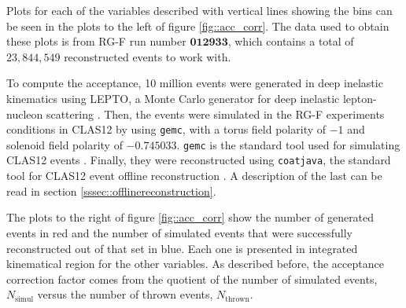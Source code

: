     Plots for each of the variables described with vertical lines showing the bins can be seen in the plots to the left of figure \ref{fig::acc_corr}.
    The data used to obtain these plots is from RG-F run number $\mathbf{012933}$, which contains a total of $23,844,549$ reconstructed events to work with.

    To compute the acceptance, 10 million events were generated in deep inelastic kinematics using LEPTO, a Monte Carlo generator for deep inelastic lepton-nucleon scattering \cite{ingelman1997}.
    Then, the events were simulated in the RG-F experiments conditions in CLAS12 by using \texttt{gemc}, with a torus field polarity of $-1$ and solenoid field polarity of $-0.745033$.
    \texttt{gemc} is the standard tool used for simulating CLAS12 events \cite{ungaro2020gemc}.
    Finally, they were reconstructed using \texttt{coatjava}, the standard tool for CLAS12 event offline reconstruction \cite{ziegler2020}.
    A description of the last can be read in section \ref{sssec::offlinereconstruction}.

    The plots to the right of figure \ref{fig::acc_corr} show the number of generated events in red and the number of simulated events that were successfully reconstructed out of that set in blue.
    Each one is presented in integrated kinematical region for the other variables.
    As described before, the acceptance correction factor comes from the quotient of the number of simulated events, $N_\text{simul}$ versus the number of thrown events, $N_\text{thrown}$.
    
